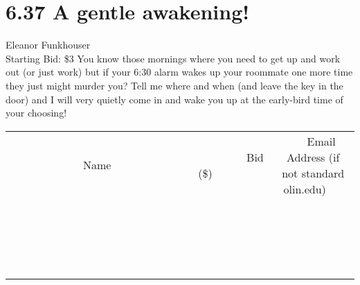 \documentclass[11pt]{article}
\begin{document}
\section*{6.37 A gentle awakening!}
Eleanor Funkhouser
\\
Starting Bid: \$3
\newline
You know those mornings where you need to get up and work out (or just work) but if your 6:30 alarm wakes up your roommate one more time they just might murder you? Tell me where and when (and leave the key in the door) and I will very quietly come in and wake you up at the early-bird time of your choosing!
\\[3ex]
\begin{tabular}{c c c}
~~~~~~~~~~~~~Name~~~~~~~~~~~~~ & ~~~~~~~~~Bid (\$)~~~~~~~~~  & ~~~Email Address (if not standard olin.edu)~~~\\
 & & \\
\hline
 & & \\
\hline
 & & \\
\hline
 & & \\
\hline
 & & \\
\hline
 & & \\
\hline
 & & \\
\hline
 & & \\
\hline
 & & \\
\hline
 & & \\
\hline
 & & \\
\hline
 & & \\
\hline
 & & \\
\hline
 & & \\
\hline
 & & \\
\hline
 & & \\
\hline
 & & \\
\hline
 & & \\
\hline
 & & \\
\hline
\end{tabular}
\newpage
\end{document}

